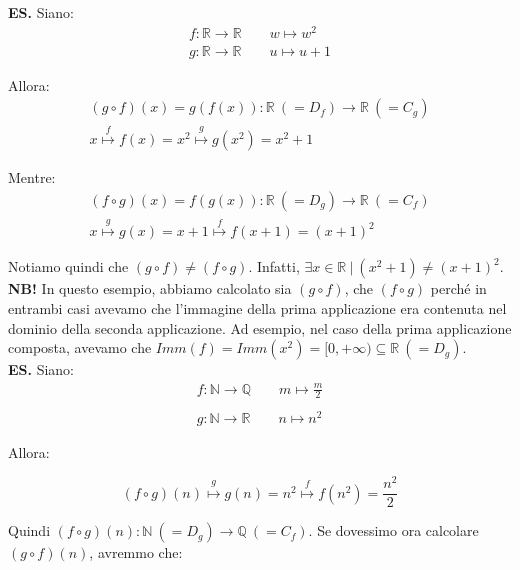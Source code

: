 \documentclass{article}
\begin{document}
\noindent\textbf{ES.} Siano: 
\begin{gather*}
    f: \mathbb{R} \xrightarrow{} \mathbb{R} \qquad w \longmapsto w^2\\
    g: \mathbb{R} \xrightarrow{} \mathbb{R} \qquad u \longmapsto u + 1
\end{gather*}

\noindent Allora: 
\begin{gather*}
    (g \circ f)(x) = g(f(x)): \mathbb{R} \ (= D_f)  \xrightarrow{} \mathbb{R} \ (= C_g) \\
    x \overset{f}{\longmapsto} f(x) = x^2 \overset{g}{\longmapsto} g(x^2) = x^2 + 1
\end{gather*}

\noindent Mentre: 
\begin{gather*}
    (f \circ g)(x) = f(g(x)): \mathbb{R} \ (= D_g)  \xrightarrow{} \mathbb{R} \ (= C_f) \\
    x \overset{g}{\longmapsto} g(x) = x + 1 \overset{f}{\longmapsto} f(x + 1) = (x + 1)^2
\end{gather*}

\noindent Notiamo quindi che $(g \circ f) \neq (f \circ g)$. Infatti, $\exists x \in \mathbb{R} \ | \ (x^2 + 1) \neq (x + 1)^2$.\\

\noindent\textbf{NB!} In questo esempio, abbiamo calcolato sia $(g \circ f)$, che $(f \circ g)$ perché in entrambi casi avevamo che l'immagine della prima applicazione era contenuta nel dominio della seconda applicazione. Ad esempio, nel caso della prima applicazione composta, avevamo che $Imm(f) = Imm(x^2) = [0, +\infty) \subseteq \mathbb{R} \ (= D_g)$.\\

\noindent\textbf{ES.} Siano:
\begin{gather*}
    f: \mathbb{N} \xrightarrow{} \mathbb{Q} \qquad m \longmapsto \frac{m}{2}\\
    \\
    g: \mathbb{N} \xrightarrow{} \mathbb{R} \qquad n \longmapsto n^2
\end{gather*}

\noindent Allora:

\begin{equation*}
    (f \circ g)(n) \overset{g}{\longmapsto} g(n) = n^2 \overset{f}{\longmapsto} f(n^2) = \frac{n^2}{2}
\end{equation*}

\noindent Quindi $(f \circ g)(n): \mathbb{N} \ (= D_g) \xrightarrow{} \mathbb{Q} \ (= C_f)$. Se dovessimo ora calcolare $(g \circ f)(n)$, avremmo che: 
\end{document}
